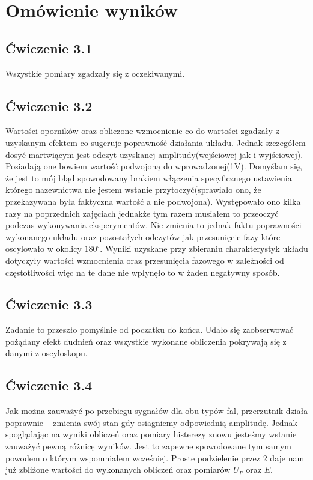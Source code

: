 \documentclass{article}
\begin{document}
  \section{Omówienie wyników}
    \subsection{Ćwiczenie 3.1}
      Wszystkie pomiary zgadzały się z oczekiwanymi.
    \subsection{Ćwiczenie 3.2}
      Wartości oporników oraz obliczone wzmocnienie co do wartości zgadzały z uzyskanym efektem co sugeruje poprawność działania układu. Jednak szczegółem dosyć martwiącym jest odczyt uzyskanej amplitudy(wejściowej jak i wyjściowej). Posiadają one bowiem wartość podwojoną do wprowadzonej(1V). Domyślam się, że jest to mój błąd spowodowany brakiem włączenia specyficznego ustawienia którego nazewnictwa nie jestem wstanie przytoczyć(sprawiało ono, że przekazywana była faktyczna wartość a nie podwojona). Występowało ono kilka razy na poprzednich zajęciach jednakże tym razem musiałem to przeoczyć podczas wykonywania eksperymentów.
      Nie zmienia to jednak faktu poprawności wykonanego układu oraz pozostałych odczytów jak przesunięcie fazy które oscylowało w okolicy $180^\circ$. Wyniki uzyskane przy zbieraniu charakterystyk układu dotyczyły wartości wzmocnienia oraz przesunięcia fazowego w zależności od częstotliwości więc na te dane nie wpłynęło to w żaden negatywny sposób.

    \subsection{Ćwiczenie 3.3}
      Zadanie to przeszło pomyślnie od poczatku do końca. Udało się zaobserwować pożądany efekt dudnień oraz wszystkie wykonane obliczenia pokrywają się z danymi z oscyloskopu.

    \subsection{Ćwiczenie 3.4}
      Jak można zauważyć po przebiegu sygnałów dla obu typów fal, przerzutnik działa poprawnie -- zmienia swój stan gdy osiagniemy odpowiednią amplitudę. Jednak spoglądając na wyniki obliczeń oraz pomiary histerezy znowu jesteśmy wstanie zauważyć pewną różnicę wyników. Jest to zapewne spowodowane tym samym powodem o którym wspomniałem wcześniej. Proste podzielenie przez 2 daje nam już zbliżone wartości do wykonanych obliczeń oraz pomiarów $U_P$ oraz $E$.
      
\end{document}
